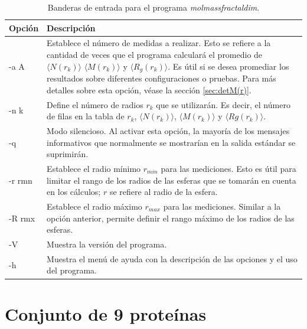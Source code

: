 	\begin{table}[H]
		\centering
		\begin{tabular}{lp{11cm}}
			\hline
			\textbf{Opci\'{o}n} & \textbf{Descripci\'{o}n} \\ \hline
			-a A & Establece el n\'{u}mero de medidas a realizar. Esto se refiere a la cantidad de veces que el programa calcular\'{a} el promedio de $\langle N(r_k) \rangle$ $\langle M(r_k) \rangle$ y $\langle R_g(r_k) \rangle$. Es \'{u}til si se desea promediar los resultados sobre diferentes configuraciones o pruebas. Para más detalles sobre esta opción, véase la sección \ref{sec:detM(r)}. 
			\\ 
			-n k & Define el n\'{u}mero de radios $r_{k}$ que se utilizar\'{a}n. Es decir, el n\'{u}mero de filas en la tabla de $r_{k}$, $\langle N(r_k) \rangle$, $\langle M(r_k) \rangle$ y $\langle Rg(r_k) \rangle$.
			\\
			-q & Modo silencioso. Al activar esta opci\'{o}n, la mayor\'{i}a de los mensajes informativos que normalmente se mostrar\'{i}an en la salida est\'{a}ndar se suprimir\'{a}n. 
			\\ 
			-r rmn & Establece el radio m\'{i}nimo $r_{min}$ para las mediciones. Esto es \'{u}til para limitar el rango de los radios de las esferas que se tomar\'{a}n en cuenta en los c\'{a}lculos; $r$ se refiere al radio de la esfera. \\ 
			-R rmx & Establece el radio m\'{a}ximo $r_{max}$ para las mediciones. Similar a la opci\'{o}n anterior, permite definir el rango m\'{a}ximo de los radios de las esferas. 
			\\ 
			-V & Muestra la versi\'{o}n del programa. 
			\\ 
			-h & Muestra el men\'{u} de ayuda con la descripci\'{o}n de las opciones y el uso del programa. 
			\\ \hline
		\end{tabular}
		\caption{Banderas de entrada para el programa \emph{molmassfractaldim}.}
		\label{tab:opciones_programa}
	\end{table}
\color{black}

\chapter{Conjunto de 9 proteínas}

